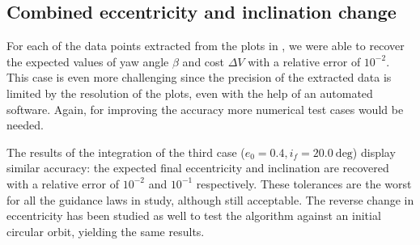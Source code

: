 \subsection{Combined eccentricity and inclination change}

For each of the data points extracted from the plots in \cite{pollard2000simplified}, we were able to recover the expected values of yaw angle $\beta$ and cost $\Delta V$ with a relative error of $10^{-2}$. This case is even more challenging since the precision of the extracted data is limited by the resolution of the plots, even with the help of an automated software. Again, for improving the accuracy more numerical test cases would be needed.

The results of the integration of the third case ($e_0 = 0.4, i_f = 20.0~\text{deg}$) display similar accuracy: the expected final eccentricity and inclination are recovered with a relative error of $10^{-2}$ and $10^{-1}$ respectively. These tolerances are the worst for all the guidance laws in study, although still acceptable. The reverse change in eccentricity has been studied as well to test the algorithm against an initial circular orbit, yielding the same results.

